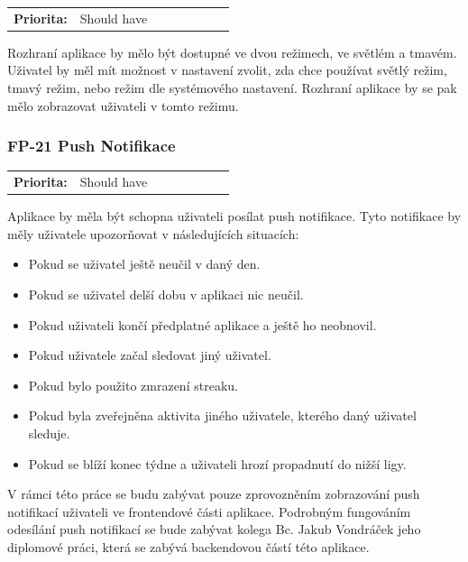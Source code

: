 \begin{tabular}{lp{0.7\linewidth}}
    \textbf{Priorita:} & Should have \\
\end{tabular}

Rozhraní aplikace by mělo být dostupné ve dvou režimech, ve světlém a tmavém. Uživatel by měl mít možnost v nastavení zvolit, zda chce používat světlý režim, tmavý režim, nebo režim dle systémového nastavení. Rozhraní aplikace by se pak mělo zobrazovat uživateli v tomto režimu.

\subsubsection{FP-21 Push Notifikace}\label{sec:fp-push-notifications}

\begin{tabular}{lp{0.7\linewidth}}
    \textbf{Priorita:} & Should have \\
\end{tabular}

Aplikace by měla být schopna uživateli posílat push notifikace. Tyto notifikace by měly uživatele upozorňovat v následujících situacích:

\begin{itemize}
    \item Pokud se uživatel ještě neučil v daný den.
    \item Pokud se uživatel delší dobu v aplikaci nic neučil.
    \item Pokud uživateli končí předplatné aplikace a ještě ho neobnovil.
    \item Pokud uživatele začal sledovat jiný uživatel.
    \item Pokud bylo použito zmrazení streaku.
    \item Pokud byla zveřejněna aktivita jiného uživatele, kterého daný uživatel sleduje.
    \item Pokud se blíží konec týdne a uživateli hrozí propadnutí do nižší ligy.
\end{itemize}


V rámci této práce se budu zabývat pouze zprovozněním zobrazování push notifikací uživateli ve frontendové části aplikace. Podrobným fungováním odesílání push notifikací se bude zabývat kolega Bc. Jakub Vondráček jeho diplomové práci, která se zabývá backendovou částí této aplikace.


